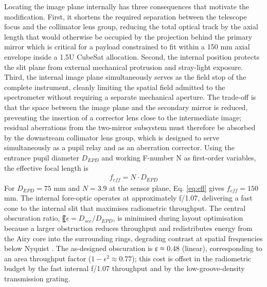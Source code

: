 \documentclass{iac}
\begin{document}
Locating the image plane internally has three consequences that motivate the modification. First, it shortens the required separation between the telescope focus and the collimator lens group, reducing the total optical track by the axial length that would otherwise be occupied by the projection behind the primary mirror which is critical for a payload constrained to fit within a 150 mm axial envelope inside a 1.5U CubeSat allocation. Second, the internal position protects the slit plane from external mechanical protrusion and stray-light exposure. Third, the internal image plane simultaneously serves as the field stop of the complete instrument, cleanly limiting the spatial field admitted to the spectrometer without requiring a separate mechanical aperture. The trade-off is that the space between the image plane and the secondary mirror is reduced, preventing the insertion of a corrector lens close to the intermediate image; residual aberrations from the two-mirror subsystem must therefore be absorbed by the downstream collimator lens group, which is designed to serve simultaneously as a pupil relay and as an aberration corrector. Using the entrance pupil diameter \(D_{EPD}\) and working F-number N as first-order variables, the effective focal length is 
\begin{eqnarray}\label{eq:efl}
    f_{eff} = N\cdot D_{EPD}
\end{eqnarray}
For \(D_{EPD} = 75 \) mm  and \(N=3.9\) at the sensor plane, Eq. \ref{eq:efl} gives \(f_{eff} =150\) mm. The internal fore-optic operates at approximately f/1.07, delivering a fast cone to the internal slit that maximises radiometric throughput. The central obscuration ratio, 〖\(\epsilon = D_{sec}/D_{EPD}\), is minimised during layout optimisation because a larger obstruction reduces throughput and redistributes energy from the Airy core into the surrounding rings, degrading contrast at spatial frequencies below Nyquist \cite{schroeder2000astronomical}. The as-designed obscuration is ε ≈ 0.48 (linear), corresponding to an area throughput factor (\(1-\epsilon^2 \approx 0.77\)); this cost is offset in the radiometric budget by the fast internal f/1.07 throughput and by the low-groove-density transmission grating. 
\end{document}
